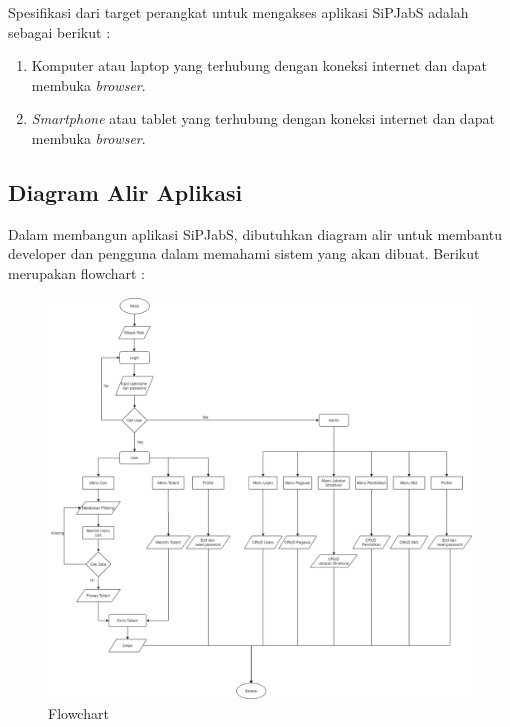 Spesifikasi dari target perangkat untuk mengakses aplikasi SiPJabS adalah sebagai berikut : 

\begin{enumerate}

\item Komputer atau laptop yang terhubung dengan koneksi internet dan dapat membuka \textit{browser}.

\item	\textit{Smartphone} atau tablet yang terhubung dengan koneksi internet dan dapat membuka \textit{browser}.
\end{enumerate}

\subsection{Diagram Alir Aplikasi}

Dalam membangun aplikasi SiPJabS, dibutuhkan diagram alir untuk membantu developer dan pengguna dalam memahami sistem yang akan dibuat. Berikut merupakan flowchart :

\begin{figure}
	\centering
	\includegraphics[width=1\textwidth]
	{pics/diagram/flowchart.png}
	\caption{Flowchart}
	\label{fig:31}
\end{figure}  

\newpage
